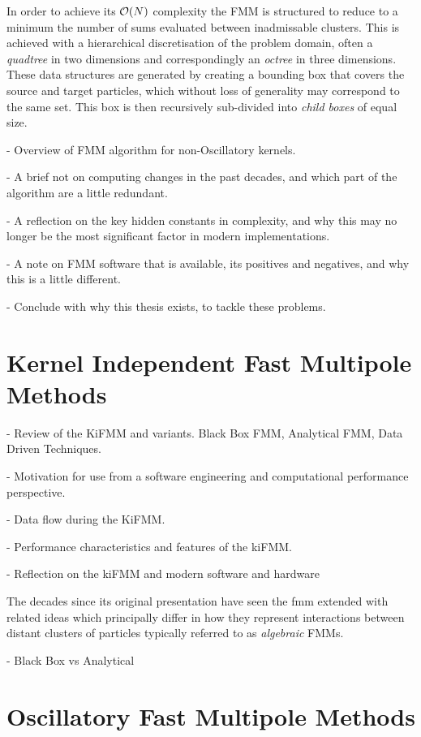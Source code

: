 In order to achieve its $\mathcal{O}(N)$ complexity the FMM is structured to reduce to a minimum the number of sums evaluated between inadmissable clusters. This is achieved with a hierarchical discretisation of the problem domain, often a \textit{quadtree} in two dimensions and correspondingly an \textit{octree} in three dimensions. These data structures are generated by creating a bounding box that covers the source and target particles, which without loss of generality may correspond to the same set. This box is then recursively sub-divided into \textit{child boxes} of equal size.

- Overview of FMM algorithm for non-Oscillatory kernels.

- A brief not on computing changes in the past decades, and which part of the algorithm are a little redundant.

- A reflection on the key hidden constants in complexity, and why this may no longer be the most significant factor in modern implementations.

- A note on FMM software that is available, its positives and negatives, and why this is a little different.

- Conclude with why this thesis exists, to tackle these problems.


\section{Kernel Independent Fast Multipole Methods}\label{chpt:fmm:sec:kifmm}

- Review of the KiFMM and variants. Black Box FMM, Analytical FMM, Data Driven Techniques.

- Motivation for use from a software engineering and computational performance perspective.

- Data flow during the KiFMM.

- Performance characteristics and features of the kiFMM.

- Reflection on the kiFMM and modern software and hardware

The decades since its original presentation have seen the \acrshort{fmm} extended with related ideas which principally differ in how they represent interactions between distant clusters of particles typically referred to as \textit{algebraic} FMMs.


- Black Box vs Analytical

\section{Oscillatory Fast Multipole Methods}

